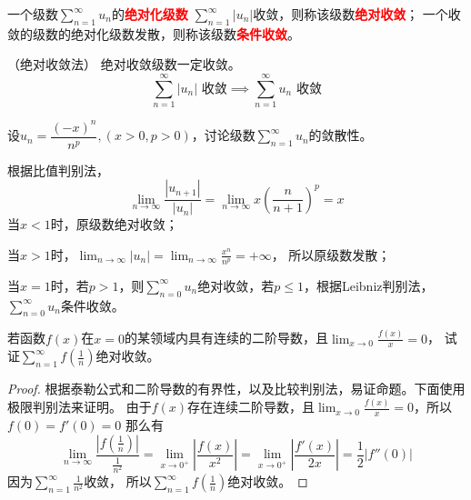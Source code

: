 一个级数$\displaystyle\sum_{n=1}^\infty u_n$的\textcolor{red}{\textbf{\textsf{绝对化级数}}}
$\displaystyle\sum_{n=1}^\infty |u_n|$收敛，则称该级数\textcolor{red}{\textbf{\textsf{绝对收敛}}}；
一个收敛的级数的绝对化级数发散，则称该级数\textcolor{red}{\textbf{\textsf{条件收敛}}}。

\begin{theorem}
    （绝对收敛法）
    \label{th:绝对收敛法}
    绝对收敛级数一定收敛。
    \[ \sum_{n=1}^\infty |u_n|\text{ 收敛}\implies \sum_{n=1}^\infty u_n \text{ 收敛} \]
\end{theorem}

\begin{example}
    设$u_n=\dfrac{(-x)^n}{n^p},(x>0,p>0)$，讨论级数$\displaystyle\sum_{n=1}^\infty u_n$的敛散性。
\end{example}
\begin{solution}
    根据比值判别法，
    \[
        \lim_{n\to\infty} \frac{|u_{n+1}|}{|u_n|}
        =
        \lim_{n\to\infty} x\left(\frac{n}{n+1}\right)^p
        =
        x
    \]
    当$x<1$时，原级数绝对收敛；

    当$x>1$时，$\displaystyle\lim_{n\to\infty}|u_n|=\lim_{n\to\infty}\frac{x^n}{n^p}=+\infty$，
    所以原级数发散；

    当$x=1$时，若$p>1$，则$\displaystyle\sum_{n=0}^\infty u_n$绝对收敛，若$p\leq 1$，根据Leibniz判别法，$\displaystyle\sum_{n=0}^\infty u_n$条件收敛。
\end{solution}

\begin{example}
    若函数$f(x)$在$x=0$的某领域内具有连续的二阶导数，且$\displaystyle\lim_{x\to 0}\frac{f(x)}{x} = 0$，
    试证$\displaystyle\sum_{n=1}^\infty f\left(\frac{1}{n}\right)$绝对收敛。
\end{example}
\begin{proof}
    根据泰勒公式和二阶导数的有界性，以及比较判别法，易证命题。下面使用极限判别法来证明。
    由于$f(x)$存在连续二阶导数，且$\displaystyle\lim_{x\to 0}\frac{f(x)}{x} = 0$，所以$f(0)=f'(0)=0$
    那么有
    \[
        \lim_{n\to\infty} \frac{\left|f\left(\frac{1}{n}\right)\right|}{\frac{1}{n^2}}
        =
        \lim_{x\to 0^+}\left|\frac{f(x)}{x^2}\right|
        =
        \lim_{x\to0^+} \left|\frac{f'(x)}{2x}\right|
        =
        \frac{1}{2}|f''(0)|
    \]
    因为$\displaystyle\sum_{n=1}^\infty\frac{1}{n^2}$收敛，
    所以$\displaystyle\sum_{n=1}^\infty f\left(\frac{1}{n}\right)$绝对收敛。
\end{proof}

